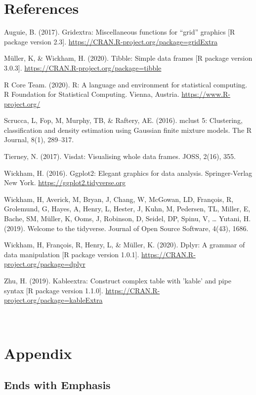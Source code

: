 \documentclass[11pt,a4paper,]{article}
\begin{document}
\clearpage

\hypertarget{references}{%
\section{References}\label{references}}

Auguie, B. (2017). Gridextra: Miscellaneous functions for ``grid'' graphics {[}R package version 2.3{]}.
\url{https://CRAN.R-project.org/package=gridExtra}

Müller, K, \& Wickham, H. (2020). Tibble: Simple data frames {[}R package version 3.0.3{]}. \url{https://CRAN.R-project.org/package=tibble}

R Core Team. (2020). R: A language and environment for statistical computing. R Foundation for Statistical Computing. Vienna, Austria. \url{https://www.R-project.org/}

Scrucca, L, Fop, M, Murphy, TB, \& Raftery, AE. (2016). mclust 5: Clustering, classification and density
estimation using Gaussian finite mixture models. The R Journal, 8(1), 289--317.

Tierney, N. (2017). Visdat: Visualising whole data frames. JOSS, 2(16), 355.

Wickham, H. (2016). Ggplot2: Elegant graphics for data analysis. Springer-Verlag New York. \url{https://ggplot2.tidyverse.org}

Wickham, H, Averick, M, Bryan, J, Chang, W, McGowan, LD, François, R, Grolemund, G, Hayes, A,
Henry, L, Hester, J, Kuhn, M, Pedersen, TL, Miller, E, Bache, SM, Müller, K, Ooms, J, Robinson,
D, Seidel, DP, Spinu, V, \ldots{} Yutani, H. (2019). Welcome to the tidyverse. Journal of Open
Source Software, 4(43), 1686.

Wickham, H, François, R, Henry, L, \& Müller, K. (2020). Dplyr: A grammar of data manipulation {[}R
package version 1.0.1{]}. \url{https://CRAN.R-project.org/package=dplyr}

Zhu, H. (2019). Kableextra: Construct complex table with 'kable' and pipe syntax {[}R package version
1.1.0{]}. \url{https://CRAN.R-project.org/package=kableExtra}

\clearpage

\appendix
\section{\\Appendix}

\hypertarget{ends-with-emphasis}{%
\subsection{Ends with Emphasis}\label{ends-with-emphasis}}
\end{document}
